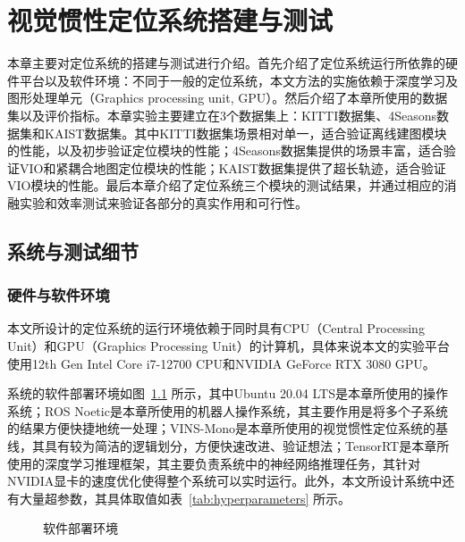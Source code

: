 




\chapter{视觉惯性定位系统搭建与测试}

本章主要对定位系统的搭建与测试进行介绍。首先介绍了定位系统运行所依靠的硬件平台以及软件环境：不同于一般的定位系统，本文方法的实施依赖于深度学习及图形处理单元（Graphics processing unit, GPU）。然后介绍了本章所使用的数据集以及评价指标。本章实验主要建立在3个数据集上：KITTI数据集、4Seasons数据集和KAIST数据集。其中KITTI数据集场景相对单一，适合验证离线建图模块的性能，以及初步验证定位模块的性能；4Seasons数据集提供的场景丰富，适合验证VIO和紧耦合地图定位模块的性能；KAIST数据集提供了超长轨迹，适合验证VIO模块的性能。最后本章介绍了定位系统三个模块的测试结果，并通过相应的消融实验和效率测试来验证各部分的真实作用和可行性。

\section{系统与测试细节}
\subsection{硬件与软件环境}

本文所设计的定位系统的运行环境依赖于同时具有CPU（Central Processing Unit）和GPU（Graphics Processing Unit）的计算机，具体来说本文的实验平台使用12th Gen Intel Core i7-12700 CPU和NVIDIA GeForce RTX 3080 GPU。

系统的软件部署环境如图~\ref{fig:software} 所示，其中Ubuntu 20.04 LTS是本章所使用的操作系统；ROS Noetic是本章所使用的机器人操作系统，其主要作用是将多个子系统的结果方便快捷地统一处理；VINS-Mono是本章所使用的视觉惯性定位系统的基线，其具有较为简洁的逻辑划分，方便快速改进、验证想法；TensorRT是本章所使用的深度学习推理框架，其主要负责系统中的神经网络推理任务，其针对NVIDIA显卡的速度优化使得整个系统可以实时运行。此外，本文所设计系统中还有大量超参数，其具体取值如表~\ref{tab:hyperparameters} 所示。

\begin{figure}
  \centering
  \caption{软件部署环境}
  \label{fig:software}
\end{figure}

